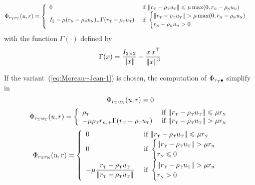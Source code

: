 \begin{equation}
  \label{eq:Phi-AC-II-rtrt}
  \Phi_{r_\t r_\t}(u,r) =
  \left\{
    \begin{array}{ll}
      0 & \text{ if }  \|r_{\t}  - \rho_{\t} u_{\t}\| \leq  \mu \max (0 ,r_{\n} - \rho_{\n} u_\n )  \\
      I_2-\mu(r_{\n} - \rho_{\n}u_\n )_+ \Gamma(r_{\t} - \rho_{\t} u_{\t})    &  \text{ if }
      \begin{cases}
        \|r_{\t}  - \rho_{\t} u_{\t}\| >  \mu \max (0 ,r_{\n} - \rho_{\n} u_\n )  \\
        r_{\n} - \rho_{\n} u_n > 0
      \end{cases} \\
    \end{array}\right.
\end{equation}
with
 the function $\Gamma(\cdot)$  defined by
\begin{equation}
  \label{eq:AC-L12}
  \Gamma(x) = \Frac{I_{2\times 2}}{\|x\|} - \Frac{x\,x^\top}{\|x\|^3}
\end{equation}

If the variant~(\ref{eq:Moreau--Jean-1}) is chosen, the computation of $\Phi_{r_{\hbox{\tiny{T}}} \bullet}$  simplify in
\begin{equation}
  \label{eq:Phi-CKPS-II-rtun}
  \Phi_{r_\t u_\n}(u,r) =   0
\end{equation}
\begin{equation}
  \label{eq:Phi-CKPS-II-rtut}
  \Phi_{r_\t u_\t}(u,r) =
  \left\{
    \begin{array}{ll}
      \rho_{\t} & \text{ if }  \|r_{\t}  - \rho_{\t} u_{\t}\| \leq  \mu r_\n  \\
      -\mu\rho_\t r_{n,+} \Gamma(r_\t-\rho_\t u_\t) & \text{ if }
      \|r_{\t}  - \rho_{\t} u_{\t}\| >  \mu r_\n  \\
    \end{array}\right.
\end{equation}
\begin{equation}
  \label{eq:Phi-CKPS-II-rtrn}
  \Phi_{r_\t r_\n}(u,r) =
  \left\{
    \begin{array}{ll}
      0 & \text{ if }  \|r_{\t}  - \rho_{\t} u_{\t}\| \leq  \mu r_{\n}  \\
      0 & \text{ if }
      \begin{cases}
        \|r_{\t}  - \rho_{\t} u_{\t}\| >  \mu r_n  \\
        r_{\n} \leq 0
      \end{cases} \\
       -\mu  \Frac{r_{\t} - \rho_{\t} u_{\t} }{ \| r_{\t} - \rho_{\t} u_{\t}\| }  &  \text{ if }
      \begin{cases}
        \|r_{\t}  - \rho_{\t} u_{\t}\| >  \mu r_n  \\
        r_{\n}  > 0
      \end{cases} \\
    \end{array}\right.
\end{equation}

